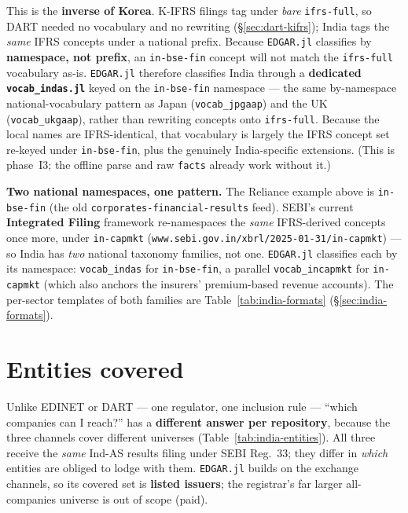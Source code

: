 \documentclass[11pt,a4paper]{report}
\begin{document}
This is the \textbf{inverse of Korea}. K-IFRS filings tag under \emph{bare} \texttt{ifrs-full}, so DART
needed no vocabulary and no rewriting (\S\ref{sec:dart-kifrs}); India tags the \emph{same} IFRS concepts
under a national prefix. Because \texttt{EDGAR.jl} classifies by \textbf{namespace, not prefix}, an
\texttt{in-bse-fin} concept will not match the \texttt{ifrs-full} vocabulary as-is. \texttt{EDGAR.jl}
therefore classifies India through a \textbf{dedicated \texttt{vocab\_indas.jl}} keyed on the
\texttt{in-bse-fin} namespace --- the same by-namespace national-vocabulary pattern as Japan
(\texttt{vocab\_jpgaap}) and the UK (\texttt{vocab\_ukgaap}), rather than rewriting concepts onto
\texttt{ifrs-full}. Because the local names are IFRS-identical, that vocabulary is largely the IFRS concept
set re-keyed under \texttt{in-bse-fin}, plus the genuinely India-specific extensions. (This is phase~I3; the
offline parse and raw \texttt{facts} already work without it.)

\medskip\noindent \textbf{Two national namespaces, one pattern.} The Reliance example above is
\texttt{in-bse-fin} (the old \texttt{corporates-financial-results} feed). SEBI's current \textbf{Integrated
Filing} framework re-namespaces the \emph{same} IFRS-derived concepts once more, under \texttt{in-capmkt}
(\texttt{www.sebi.gov.in/xbrl/2025-01-31/in-capmkt}) --- so India has \emph{two} national taxonomy families,
not one. \texttt{EDGAR.jl} classifies each by its namespace: \texttt{vocab\_indas} for \texttt{in-bse-fin},
a parallel \texttt{vocab\_incapmkt} for \texttt{in-capmkt} (which also anchors the insurers' premium-based
revenue accounts). The per-sector templates of both families are Table~\ref{tab:india-formats}
(\S\ref{sec:india-formats}).

\section{Entities covered}\label{sec:india-entities}

Unlike EDINET or DART --- one regulator, one inclusion rule --- ``which companies can I reach?'' has a
\textbf{different answer per repository}, because the three channels cover different universes
(Table~\ref{tab:india-entities}). All three receive the \emph{same} Ind-AS results filing under SEBI
Reg.~33; they differ in \emph{which} entities are obliged to lodge with them. \texttt{EDGAR.jl} builds on the
exchange channels, so its covered set is \textbf{listed issuers}; the registrar's far larger all-companies
universe is out of scope (paid).
\end{document}
